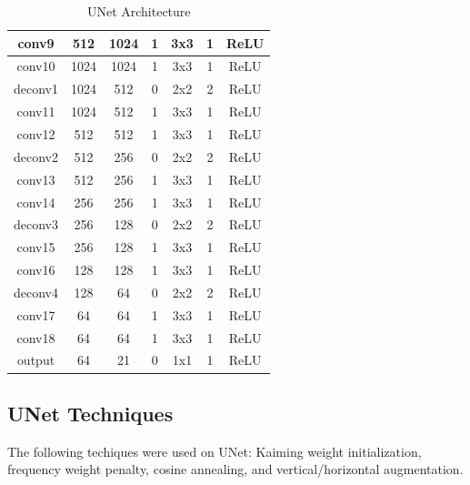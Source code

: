 \begin{table}[H]
\begin{tabular}{|c|c|c|c|c|c|c|}
		conv9          & 512         & 1024         & 1                & 3x3             & 1               & ReLU                \\ \hline
		conv10         & 1024        & 1024         & 1                & 3x3             & 1               & ReLU                \\ \hline
		deconv1        & 1024        & 512          & 0                & 2x2             & 2               & ReLU                \\ \hline
		conv11         & 1024        & 512          & 1                & 3x3             & 1               & ReLU                \\ \hline
		conv12         & 512         & 512          & 1                & 3x3             & 1               & ReLU                \\ \hline
		deconv2        & 512         & 256          & 0                & 2x2             & 2               & ReLU                \\ \hline
		conv13         & 512         & 256          & 1                & 3x3             & 1               & ReLU                \\ \hline
		conv14         & 256         & 256          & 1                & 3x3             & 1               & ReLU                \\ \hline
		deconv3        & 256         & 128          & 0                & 2x2             & 2               & ReLU                \\ \hline
		conv15         & 256         & 128          & 1                & 3x3             & 1               & ReLU                \\ \hline
		conv16         & 128         & 128          & 1                & 3x3             & 1               & ReLU                \\ \hline
		deconv4        & 128         & 64           & 0                & 2x2             & 2               & ReLU                \\ \hline
		conv17         & 64          & 64           & 1                & 3x3             & 1               & ReLU                \\ \hline
		conv18         & 64          & 64           & 1                & 3x3             & 1               & ReLU                \\ \hline
		output         & 64          & 21           & 0                & 1x1             & 1               & ReLU                \\ \hline
	\end{tabular}
	\caption{UNet Architecture}
\end{table}

\subsection*{UNet Techniques}
The following techiques were used on UNet: Kaiming weight initialization, frequency weight penalty, cosine annealing, and vertical/horizontal augmentation.